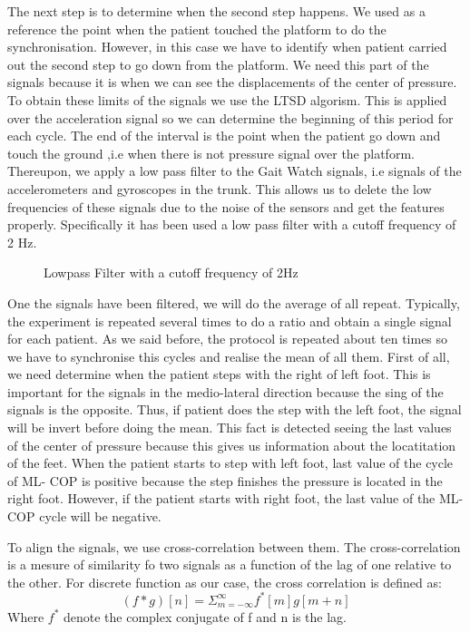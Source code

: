 The next step is to determine when the second step happens. We used as a reference the point when the patient touched the platform to do the synchronisation. However, in this case we have to identify when patient carried out the second step to go down from the platform. We need this part of the signals because it is when we can see the displacements of the center of pressure. To obtain these limits of the signals we use the LTSD algorism. This is applied over the acceleration signal so we can determine the beginning of this period for each cycle. The end of the interval is the point when the patient go down and touch the ground ,i.e when there is not pressure signal over the platform.
Thereupon, we apply a low pass filter to the  Gait Watch signals, i.e signals of the accelerometers and gyroscopes in the trunk. This allows us to delete the low frequencies  of these signals due to the noise of the sensors and get the features properly. Specifically it has been used a low pass filter with a cutoff frequency of 2 Hz.

\begin{figure}[H]
	\centering
	\caption{Lowpass Filter with a cutoff frequency of 2Hz}
	\label{fig:lowpassFilter}
\end{figure} 

One the signals have been filtered, we will do the average of all repeat. Typically, the experiment is repeated several times to do a ratio and obtain a single signal for each patient. As we said before, the protocol is repeated about ten times so we have to synchronise this cycles and realise the mean of all them.  First of all, we need determine when the patient steps with the right of left foot. This is important for the signals in the medio-lateral direction because the sing of the signals is the opposite. Thus, if patient does the step with the left foot, the signal will be invert before doing the mean. This fact is detected seeing the last values of the center of pressure because this gives us information about the locatitation of the feet.
When the patient starts to step with left foot, last value of the cycle of ML- COP is positive because the step finishes the pressure is located in the right foot. However, if the patient starts with right foot, the last value of the ML-COP cycle will be negative.

To align the signals, we use cross-correlation between them. The cross-correlation is a mesure of similarity fo two signals as a function of the lag of one relative to the other\cite{Cross-corr}. For discrete function as our case, the cross correlation is defined as:
\begin{equation}
\label{cross-corr}
(f*g)[n]=\varSigma_{m=-\infty}^{\infty} f^{*}[m]g[m+n]
\end{equation}
Where $ f^{*}$ denote the complex conjugate of f and n is the lag.

